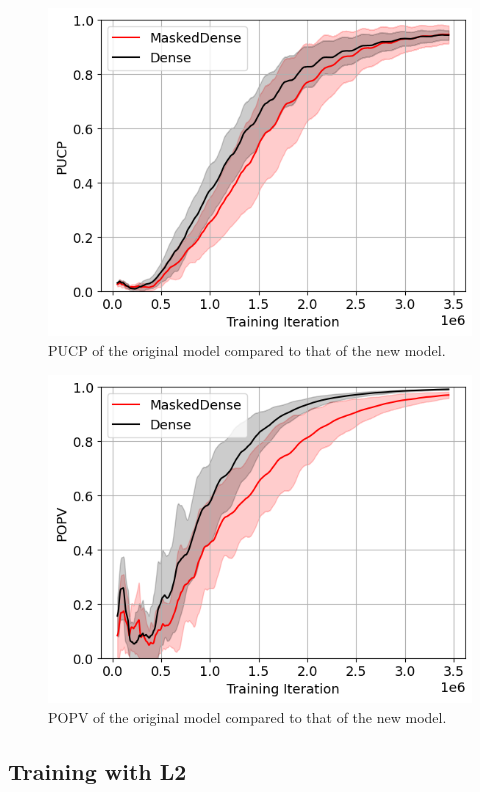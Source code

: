 \documentclass[twocolumn,a4paper,11pt]{article}
\begin{document}
    \begin{figure}[h]
        \centering
        \includegraphics[width=0.9\linewidth]{ex-img/final-nol2-pucp.png}
        \caption{PUCP of the original model compared to that of the new model.} \label{fig:ex-A}
    \end{figure}

    \begin{figure}[h]
        \centering
        \includegraphics[width=0.9\linewidth]{ex-img/final-nol2-popv.png}
        \caption{POPV of the original model compared to that of the new model.} \label{fig:ex-A2}
    \end{figure}

    \subsection{Training with L2}
\end{document}
